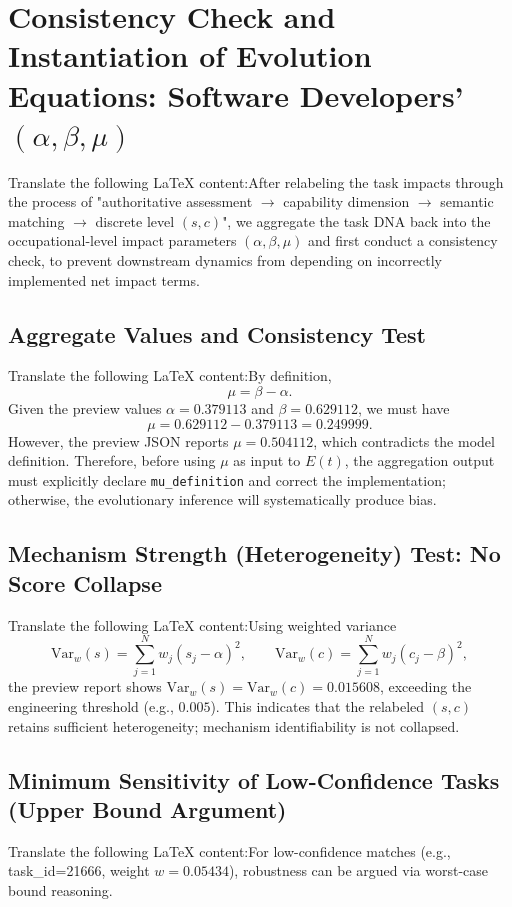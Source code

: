 \section{Consistency Check and Instantiation of Evolution Equations: Software Developers' $(\alpha,\beta,\mu)$}Translate the following LaTeX content:After relabeling the task impacts through the process of "authoritative assessment $\rightarrow$ capability dimension $\rightarrow$ semantic matching $\rightarrow$ discrete level $(s,c)$",  
we aggregate the task DNA back into the occupational-level impact parameters $(\alpha,\beta,\mu)$ and first conduct a consistency check,  
to prevent downstream dynamics from depending on incorrectly implemented net impact terms.\subsection{Aggregate Values and Consistency Test}Translate the following LaTeX content:By definition,
\begin{equation}
    \mu=\beta-\alpha.
\end{equation}
Given the preview values $\alpha=0.379113$ and $\beta=0.629112$, we must have
\begin{equation}
    \mu = 0.629112-0.379113 = 0.249999.
\end{equation}
However, the preview JSON reports $\mu=0.504112$, which contradicts the model definition.
Therefore, before using $\mu$ as input to $E(t)$, the aggregation output must explicitly declare \texttt{mu\_definition} and correct the implementation;
otherwise, the evolutionary inference will systematically produce bias.\subsection{Mechanism Strength (Heterogeneity) Test: No Score Collapse}Translate the following LaTeX content:Using weighted variance
\begin{equation}
    \mathrm{Var}_w(s)=\sum_{j=1}^{N} w_j (s_j-\alpha)^2,\qquad
    \mathrm{Var}_w(c)=\sum_{j=1}^{N} w_j (c_j-\beta)^2,
\end{equation}
the preview report shows $\mathrm{Var}_w(s)=\mathrm{Var}_w(c)=0.015608$, exceeding the engineering threshold (e.g., $0.005$).
This indicates that the relabeled $(s,c)$ retains sufficient heterogeneity; mechanism identifiability is not collapsed.\subsection{Minimum Sensitivity of Low-Confidence Tasks (Upper Bound Argument)}Translate the following LaTeX content:For low-confidence matches (e.g., task\_id=21666, weight $w=0.05434$), robustness can be argued via worst-case bound reasoning.
